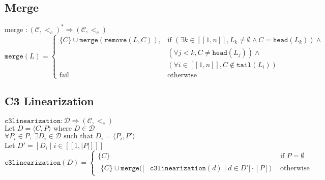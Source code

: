 \documentclass{article}
\newcommand*{\DD}{\ensuremath{\mathcal{D}}\xspace}
\newcommand*{\ordCC}{\ensuremath{(\mathcal{C}, <_c)}\xspace}
\newcommand*{\cl}{\texttt{c3linearization}}
\newcommand*{\rem}{\texttt{remove}}
\newcommand*{\h}{\texttt{head}}
\newcommand*{\mer}{\texttt{merge}}
\newcommand*{\oneToN}{\ensuremath{[\![1,n]\!]}\xspace}
\begin{document}
\subsection*{Merge}
merge $: \ordCC^* \Rightarrow \ordCC $ \\


\[
\mer(L) =
\begin{cases}
\{C\} \cup \mer(\rem(L, C)), & \text{if } (\exists k \in \oneToN, L_k \neq \emptyset \land C = \h(L_k)) \land \\
& (\forall j < k, C \neq \h(L_j)) \land \\ 
& (\forall i \in \oneToN,C \notin \texttt{tail}(L_i)) \\ 

\text{fail}  & \text{otherwise}
\end{cases}
\]

\subsection*{C3 Linearization}
$\cl: \DD \Rightarrow \ordCC$\\
$\text{Let } D = \langle C, P \rangle \text{ where } D \in \DD$\\
$\forall P_i \in P, \; \exists D_i \in \DD \text{ such that } D_i = \langle P_i, P' \rangle$\\
Let $D' = [D_i \mid i \in  [\![1, |P|]\!] ]$\\
\[
\cl(D) =
\begin{cases}
\{C\} & \text{if } P = \emptyset \\
\begin{split}
\{C\} \cup \mer([&\cl(d) \mid d \in D'] \cdot [P]) 
\end{split} & \text{otherwise}
\end{cases}
\]
\end{document}
